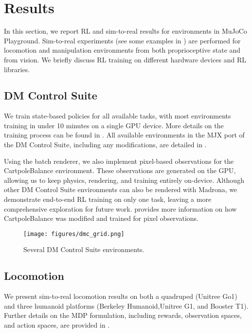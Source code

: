 \section{Results}
\label{sec:results}

In this section, we report RL and sim-to-real results for environments in MuJoCo Playground. Sim-to-real experiments (see some examples in ) are performed for locomotion and manipulation environments from both proprioceptive state and from vision.
We briefly discuss RL training on different hardware devices and RL libraries.

\subsection{DM Control Suite}

We train state-based policies for all available tasks, with most environments training in under 10 minutes on a single GPU device. More details on the training process can be found in . All available environments in the MJX port of the DM Control Suite, including any modifications, are detailed in . 

Using the batch renderer, we also implement pixel-based observations for the CartpoleBalance environment. These observations are generated on the GPU, allowing us to keep physics, rendering, and training entirely on-device. Although other DM Control Suite environments can also be rendered with Madrona, we demonstrate end-to-end RL training on only one task, leaving a more comprehensive exploration for future work.  provides more information on how CartpoleBalance was modified and trained for pixel observations.

\begin{figure}[h!]
    \centering
    \texttt{[image: figures/dmc\_grid.png]}
    \caption{\small Several DM Control Suite environments.}
    \label{fig:dmc_grid}
\end{figure}

\subsection{Locomotion}
\label{sec:results_sim2real_locomotion}

We present sim-to-real locomotion results on both a quadruped (Unitree Go1) and three humanoid platforms (Berkeley Humanoid,Unitree G1, and Booster T1). Further details on the MDP formulation, including rewards, observation spaces, and action spaces, are provided in .


